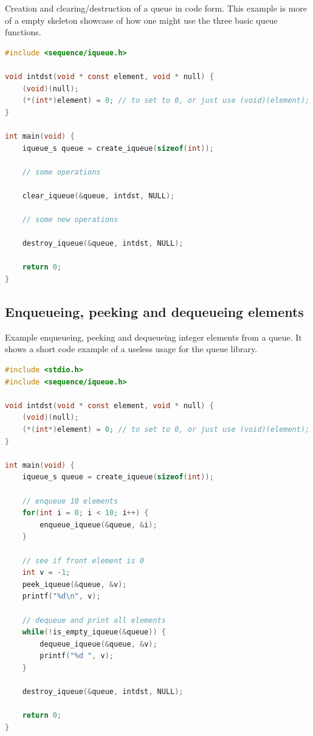 Creation and clearing/destruction of a queue in code form. This example is more of a empty skeleton showcase of how one might use the three basic queue functions.

\begin{lstlisting}[language=C, style=CodeEditor, label=lst:queue-example-01]
#include <sequence/iqueue.h>

void intdst(void * const element, void * null) {
    (void)(null);
    (*(int*)element) = 0; // to set to 0, or just use (void)(element);
}

int main(void) {
    iqueue_s queue = create_iqueue(sizeof(int));

    // some operations

    clear_iqueue(&queue, intdst, NULL);

    // some new operations

    destroy_iqueue(&queue, intdst, NULL);

    return 0;
}
\end{lstlisting}

\subsection{Enqueueing, peeking and dequeueing elements}

Example enqueueing, peeking and dequeueing integer elements from a queue. It shows a short code example of a useless usage for the queue library.

\begin{lstlisting}[language=C, style=CodeEditor, label=lst:queue-example-02]
#include <stdio.h>
#include <sequence/iqueue.h>

void intdst(void * const element, void * null) {
    (void)(null);
    (*(int*)element) = 0; // to set to 0, or just use (void)(element);
}

int main(void) {
    iqueue_s queue = create_iqueue(sizeof(int));

    // enqueue 10 elements
    for(int i = 0; i < 10; i++) {
        enqueue_iqueue(&queue, &i);
    }

    // see if front element is 0
    int v = -1;
    peek_iqueue(&queue, &v);
    printf("%d\n", v);

    // dequeue and print all elements
    while(!is_empty_iqueue(&queue)) {
        dequeue_iqueue(&queue, &v);
        printf("%d ", v);
    }

    destroy_iqueue(&queue, intdst, NULL);

    return 0;
}
\end{lstlisting}

